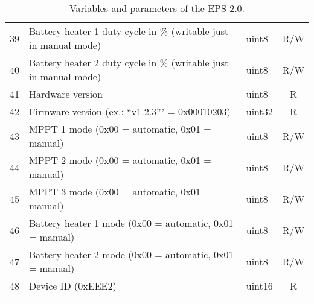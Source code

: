 \begin{longtable}[c]{cL{0.72\textwidth}lc}
    39  & Battery heater 1 duty cycle in \% (writable just in manual mode)  & uint8  & R/W \\
    40  & Battery heater 2 duty cycle in \% (writable just in manual mode)  & uint8  & R/W \\
    41  & Hardware version                                                  & uint8  & R \\
    42  & Firmware version (ex.: ``v1.2.3''' = 0x00010203)                  & uint32 & R \\
    43  & MPPT 1 mode (0x00 = automatic, 0x01 = manual)                     & uint8  & R/W \\
    44  & MPPT 2 mode (0x00 = automatic, 0x01 = manual)                     & uint8  & R/W \\
    45  & MPPT 3 mode (0x00 = automatic, 0x01 = manual)                     & uint8  & R/W \\
    46  & Battery heater 1 mode (0x00 = automatic, 0x01 = manual)           & uint8  & R/W \\
    47  & Battery heater 2 mode (0x00 = automatic, 0x01 = manual)           & uint8  & R/W \\
    48  & Device ID (0xEEE2)                                                & uint16 & R \\
    \bottomrule[1.5pt]
    \caption{Variables and parameters of the EPS 2.0.}
    \label{tab:eps2-variables}
\end{longtable}

